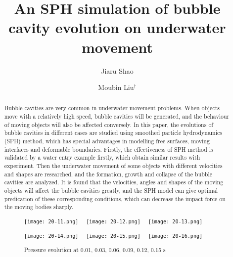 \documentclass[10pt]{article}
\title{An SPH simulation of bubble cavity evolution on underwater movement}
\date{}
\author[1]{Jiaru Shao}
\author[2]{Moubin Liu$^\dagger$}
\affil[1]{College of Mechanical Engineering, Chongqing University of Technology, Chongqing, China}
\affil[2]{College of Engineering, Peking University, Beijing, China}
\affil[$\relax$]{\email{\dagger}{mbliu@pku.edu.cn}}
\begin{document}
\maketitle


\begin{abstract}
Bubble cavities are very common in underwater movement problems. When objects move with a relatively high speed, bubble cavities will be generated, and the behaviour of moving objects will also be affected conversely. In this paper, the evolutions of bubble cavities in different cases are studied using smoothed particle hydrodynamics (SPH) method, which has special advantages in modelling free surfaces, moving interfaces and deformable boundaries. Firstly, the effectiveness of SPH method is validated by a water entry example firstly, which obtain similar results with experiment. Then the underwater movement of some objects with different velocities and shapes are researched, and the formation, growth and collapse of the bubble cavities are analyzed. It is found that the velocities, angles and shapes of the moving objects will affect the bubble cavities greatly, and the SPH model can give optimal predication of these corresponding conditions, which can decrease the impact force on the moving bodies sharply.

\begin{figure}[!htb]
\centering
\texttt{[image: 20-11.png]}~~
\texttt{[image: 20-12.png]}~~
\texttt{[image: 20-13.png]}

\texttt{[image: 20-14.png]}~~
\texttt{[image: 20-15.png]}~~
\texttt{[image: 20-16.png]}
\caption{Pressure evolution at 0.01, 0.03, 0.06, 0.09, 0.12, 0.15 s}\label{fig:}
\end{figure}
\end{abstract}



\end{document}
